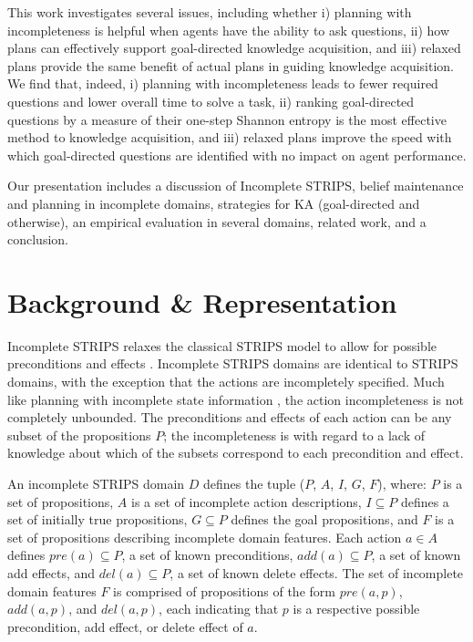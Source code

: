 \documentclass{article}
\begin{document}
This work investigates several issues, including whether i)
planning with incompleteness is helpful when agents have the ability to ask questions, ii) how
plans can effectively support goal-directed knowledge acquisition, and iii)
relaxed plans provide the same benefit of actual plans in guiding knowledge
acquisition.  We find that, indeed, i) planning with incompleteness leads to
fewer required questions and lower overall time to solve a task, ii) ranking
goal-directed questions by a measure of their one-step Shannon entropy is the
most effective method to knowledge acquisition, and iii) relaxed plans improve
the speed with which goal-directed questions are identified with no
impact on agent performance.

Our presentation includes a discussion of Incomplete STRIPS, belief maintenance
and planning in incomplete domains, strategies for KA
(goal-directed and otherwise), an empirical evaluation in several domains,
related work, and a conclusion.

\section{Background \& Representation}\label{sec:background}

Incomplete STRIPS relaxes the classical STRIPS model to allow for
possible preconditions and effects \citep{Garland02}.  
Incomplete STRIPS domains are identical to STRIPS domains, with the exception
that the actions are incompletely specified.  Much like planning with incomplete
state information \citep{bonet00planning}, the action incompleteness is not
completely unbounded.  The preconditions and effects of each action can be any
subset of the propositions $P$; the incompleteness is with regard to a lack of
knowledge about which of the subsets correspond to each precondition and effect.        

 An incomplete STRIPS domain ${D}$  defines the
tuple ($P$, ${A}$, $I$, $G$, $F$), where: $P$ is a  set of propositions, ${A}$
is a set of incomplete  action descriptions, $I \subseteq P$ defines a set of
initially true  propositions, $G \subseteq P$ defines the goal propositions, and
$F$ is a set of propositions describing incomplete domain features. Each action
${a} \in {A}$ defines $pre({a}) \subseteq P$, a set of known preconditions,
$add({a}) \subseteq P$, a set of known add  effects, and $del({a}) \subseteq P$,
a set of known delete effects.   The set of incomplete domain features $F$ is
comprised of propositions of the form $pre({a}, p)$, $add({a}, p)$, and
$del({a}, p)$, each indicating that $p$ is a respective possible precondition, add effect, or
delete effect of $a$.
\end{document}
